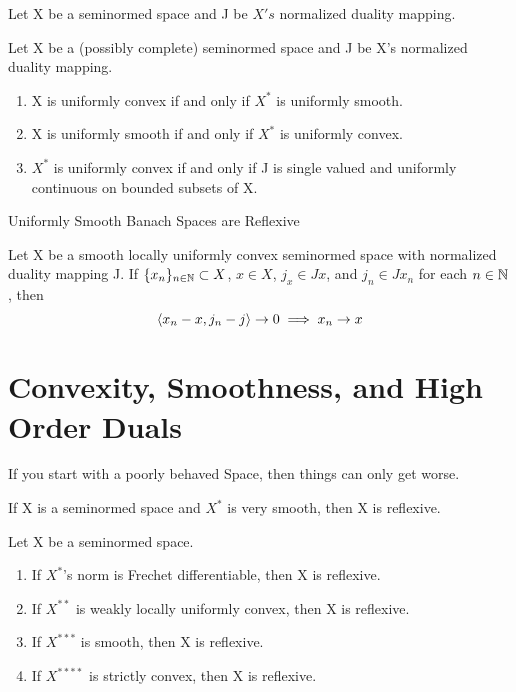 \begin{prop} %
\end{prop} 
\begin{prop}
\end{prop} 
\begin{prop}
Let X be a seminormed space and J be $X's$ normalized duality mapping. 
\end{prop} 
\begin{prop}
Let X be a (possibly complete) seminormed space and J be X's normalized duality mapping.  
\begin{enumerate}
\item X is uniformly convex if and only if $X^*$ is uniformly smooth. 
\item X is uniformly smooth if and only if $X^*$ is uniformly convex. 
\item $X^*$ is uniformly convex if and only if J is single valued and uniformly continuous on bounded subsets of X. 
\end{enumerate} 
\end{prop}
\begin{cor} Uniformly Smooth Banach Spaces are Reflexive %
\end{cor}
\begin{prop}
Let X be a smooth locally uniformly convex seminormed space with normalized duality mapping J. If $\{x_n\}_{n \in \mathbb{N}} \subset X$, $x \in X$, $j_x \in Jx$, and $j_n \in Jx_n$ for each $n \in \mathbb{N}$, then 
\begin{equation} 
\left\langle x_n-x, j_n-j \right\rangle \to 0 \implies x_n \to x
\end{equation} 
\end{prop} 

\section{Convexity, Smoothness, and High Order Duals}
If you start with a poorly behaved Space, then things can only get worse. 

\begin{thm} %
If X is a seminormed space and $X^* $ is very smooth, then X is reflexive.
\end{thm} 

\begin{cor}
Let X be a seminormed space. 
\begin{enumerate}
\item If $X^*$'s norm is Frechet differentiable, then X is reflexive. 
\item If $X^{**}$ is weakly locally uniformly convex, then X is reflexive. 
\item If $X^{***}$ is smooth, then X is reflexive. 
\item If $X^{****}$ is strictly convex, then X is reflexive.
\end{enumerate}
\end{cor} 